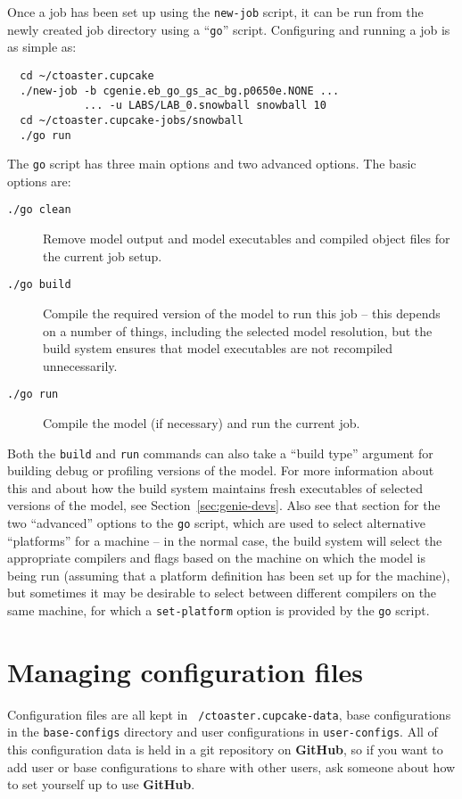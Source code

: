 \documentclass[a4paper,10pt,article]{memoir}
\begin{document}
Once a job has been set up using the \texttt{new-job} script, it can
be run from the newly created job directory using a ``\texttt{go}''
script.  Configuring and running a job is as simple as:
\begin{verbatim}
  cd ~/ctoaster.cupcake
  ./new-job -b cgenie.eb_go_gs_ac_bg.p0650e.NONE ...
            ... -u LABS/LAB_0.snowball snowball 10
  cd ~/ctoaster.cupcake-jobs/snowball
  ./go run
\end{verbatim}
The \texttt{go} script has three main options and two advanced
options.  The basic options are:
\begin{description}
  \item[\texttt{./go clean}]{Remove model output and model executables
    and compiled object files for the current job setup.}
  \item[\texttt{./go build}]{Compile the required version of the model
    to run this job -- this depends on a number of things, including
    the selected model resolution, but the build system ensures that
    model executables are not recompiled unnecessarily.}
  \item[\texttt{./go run}]{Compile the model (if necessary) and run
    the current job.}
\end{description}
Both the \texttt{build} and \texttt{run} commands can also take a
``build type'' argument for building debug or profiling versions of
the model.  For more information about this and about how the build
system maintains fresh executables of selected versions of the model,
see Section~\ref{sec:genie-devs}.  Also see that section for the two
``advanced'' options to the \texttt{go} script, which are used to
select alternative ``platforms'' for a machine -- in the normal case,
the build system will select the appropriate compilers and flags based
on the machine on which the model is being run (assuming that a
platform definition has been set up for the machine), but sometimes it
may be desirable to select between different compilers on the same
machine, for which a \texttt{set-platform} option is provided by the
\texttt{go} script.

\section{Managing configuration files}

Configuration files are all kept in \texttt{~/ctoaster.cupcake-data}, base
configurations in the \texttt{base-configs} directory and user
configurations in \texttt{user-configs}.  All of this configuration
data is held in a git repository on \textbf{GitHub}, so if you want to add user
or base configurations to share with other users, ask someone about
how to set yourself up to use \textbf{GitHub}.
\end{document}
